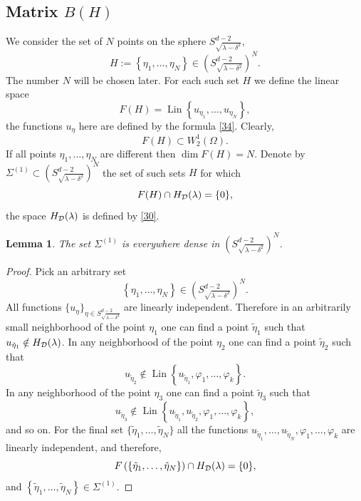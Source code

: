 \documentclass[a4paper,12pt]{article}
\numberwithin{equation}{section}
\def \de{\delta}
\def \la{\lambda}
\def \ph{\varphi}
\def \O{\Omega}
\newcommand{\<}{\langle}
\renewcommand{\>}{\rangle}
\theoremstyle{plain}
\newtheorem{lemma}[theorem]{\bf Lemma}
\theoremstyle{definition}
\theoremstyle{remark}
\begin{document}
\subsection{Matrix $B(H)$}
We consider the set of $N$ points on the sphere $S_{\sqrt{\la-\de^2}}^{d-2}$,
$$
H := \left\{\eta_1, \dots, \eta_N\right\} \in \left(S_{\sqrt{\la-\de^2}}^{d-2}\right)^N.
$$
The number $N$ will be chosen later.
For each such set $H$ we define the linear space
$$
F (H) = \operatorname{Lin} \left\{u_{\eta_1}, \dots, u_{\eta_N}\right\},
$$
the functions $u_\eta$ here are defined by the formula \eqref{34}.
Clearly,
$$
F (H) \subset W_2^1 (\O).
$$
If all points $\eta_1, \dots, \eta_N$ are different then $\dim F(H) = N$.
Denote by $\Sigma^{(1)} \subset \left(S_{\sqrt{\la-\de^2}}^{d-2}\right)^N$
the set of such sets $H$ for which
\begin{equation}
\label{375}
F (H) \cap H_{\cal D} (\la) = \{0\},
\end{equation}
the space $H_{\cal D} (\la)$ is defined by \eqref{30}.

\begin{lemma}
\label{l39}
The set $\Sigma^{(1)}$ is everywhere dense in $\left(S_{\sqrt{\la-\de^2}}^{d-2}\right)^N$.
\end{lemma}

\begin{proof}
Pick an arbitrary set
$$
\left\{\eta_1, \dots, \eta_N\right\} \in \left(S_{\sqrt{\la-\de^2}}^{d-2}\right)^N.
$$
All functions $\{u_\eta\}_{\eta \in S_{\sqrt{\la-\de^2}}^{d-2}}$ are linearly independent.
Therefore in an arbitrarily small neighborhood of the point $\eta_1$
one can find a point $\tilde \eta_1$ such that
$u_{\tilde \eta_1} \notin H_{\cal D} (\la)$.
In any neighborhood of the point $\eta_2$ one can find a point $\tilde \eta_2$ such that
$$
u_{\tilde \eta_2} \notin \operatorname{Lin} \left\{u_{\tilde \eta_1}, \ph_1, \dots, \ph_k\right\}.
$$
In any neighborhood of the point $\eta_3$ one can find a point $\tilde \eta_3$ such that
$$
u_{\tilde \eta_3} \notin 
\operatorname{Lin} \left\{u_{\tilde \eta_1}, u_{\tilde \eta_2}, \ph_1, \dots, \ph_k\right\},
$$
and so on.
For the final set $\{\tilde\eta_1, \dots, \tilde\eta_N\}$ all the functions
$u_{\tilde \eta_1}, \dots, u_{\tilde \eta_N}, \ph_1, \dots, \ph_k$
are linearly independent, and therefore,
$$
F \left(\left\{\tilde\eta_1, \dots, \tilde\eta_N\right\}\right) \cap H_{\cal D} (\la) = \{0\},
$$
and 
$\left\{\tilde\eta_1, \dots, \tilde\eta_N\right\} \in \Sigma^{(1)}$.
\end{proof}
\end{document}
